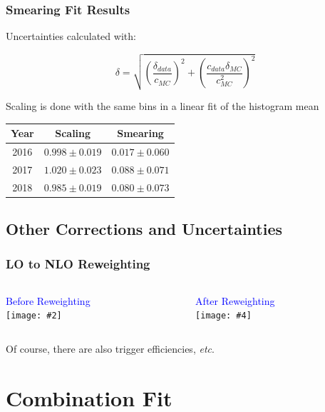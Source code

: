 \documentclass{beamer}
\newcommand{\twofigs}[4]{
  \begin{columns}
    \begin{column}{0.5\linewidth}
      \centering
      \textcolor{blue}{#1} \\
      \texttt{[image: \#2]}
    \end{column}
    \begin{column}{0.5\linewidth}
      \centering
      \textcolor{blue}{#3} \\
      \texttt{[image: \#4]}
    \end{column}
  \end{columns}
}
\begin{document}
\begin{frame}
  \frametitle{Smearing Fit Results}

  Uncertainties calculated with:

  \[
  \delta = \sqrt{\left(\frac{\delta_{data}}{c_{MC}}\right)^2 +
    \left(\frac{c_{data}\delta_{MC}}{c_{MC}^2}\right)^2}
  \]

  \vfill

  Scaling is done with the same bins in a linear fit of the histogram mean

  \vfill

  \begin{center}
    \begin{tabular}{c|c|c}
      \hline
      Year & Scaling & Smearing \\
      \hline
      2016 & $0.998 \pm 0.019$ & $0.017 \pm 0.060$ \\
      2017 & $1.020 \pm 0.023$ & $0.088 \pm 0.071$ \\
      2018 & $0.985 \pm 0.019$ & $0.080 \pm 0.073$ \\
      \hline
    \end{tabular}
  \end{center}


\end{frame}

\subsection{Other Corrections and Uncertainties}

\begin{frame}
  \frametitle{LO to NLO Reweighting}

  \twofigs{Before Reweighting}
          {figures/Vjets_NLOreweighting_2017V5_Znn_withoutWeight.pdf}
          {After Reweighting}
          {figures/Vjets_NLOreweighting_2017V5_Znn_withWeight.pdf}

  Of course, there are also trigger efficiencies, \emph{etc}.

\end{frame}

\section{Combination Fit}
\end{document}
